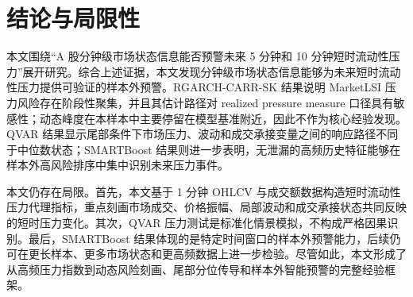 \section{结论与局限性}

本文围绕“A 股分钟级市场状态信息能否预警未来 5 分钟和 10 分钟短时流动性压力”展开研究。综合上述证据，本文发现分钟级市场状态信息能够为未来短时流动性压力提供可验证的样本外预警。RGARCH-CARR-SK 结果说明 MarketLSI 压力风险存在阶段性聚集，并且其估计路径对 realized pressure measure 口径具有敏感性；动态峰度在本样本中主要停留在模型基准附近，因此不作为核心经验发现。QVAR 结果显示尾部条件下市场压力、波动和成交承接变量之间的响应路径不同于中位数状态；SMARTBoost 结果则进一步表明，无泄漏的高频历史特征能够在样本外高风险排序中集中识别未来压力事件。

本文仍存在局限。首先，本文基于 1 分钟 OHLCV 与成交额数据构造短时流动性压力代理指标，重点刻画市场成交、价格振幅、局部波动和成交承接状态共同反映的短时压力变化。其次，QVAR 压力测试是标准化情景模拟，不构成严格因果识别。最后，SMARTBoost 结果体现的是特定时间窗口的样本外预警能力，后续仍可在更长样本、更多市场状态和更高频数据上进一步检验。尽管如此，本文形成了从高频压力指数到动态风险刻画、尾部分位传导和样本外智能预警的完整经验框架。
